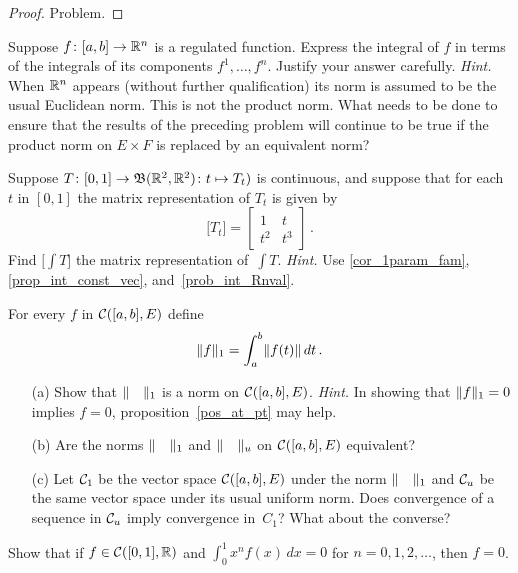 \begin{proof} Problem.  \ns  \end{proof}


\begin{prob}\label{prob_int_Rnval}  Suppose $f \colon [a,b] \rightarrow \mathbb{R}^n$ is a regulated function.
Express the integral of $f$ in terms of the integrals of its components $f^1, \dots, f^n$.
Justify your answer carefully.  \emph{Hint.}  When $\mathbb{R}^n$ appears (without further
qualification) its norm is assumed to be the usual Euclidean norm.  This is not the product
norm.  What needs to be done to ensure that the results of the preceding problem will continue
to be true if the product norm on $E \times F$ is replaced by an equivalent norm?
\end{prob}

\begin{prob} Suppose $T \colon [0,1] \rightarrow \mathfrak{B}(\mathbb{R}^2,\mathbb{R}^2)\colon  t \mapsto T_t)$ is continuous,
and suppose that for each $t$ in $[0,1]$ the matrix representation of $T_t$  is given by
  \[ \bigl[T_t\bigr] = \begin{bmatrix} 1 & t \\ t^2 & t^3 \end{bmatrix}\,. \]
Find $\bigl[\int T\bigr]$ the matrix representation of~$\int T$. \emph{Hint.} Use
\ref{cor_1param_fam}, \ref{prop_int_const_vec}, and~\ref{prob_int_Rnval}.
\end{prob}

\begin{prob}  For every $f$ in $\mathcal{C}([a,b],E)$ define
  \[ \lVert f\rVert_1 = \int_a^b \lVert f(t)\rVert\,dt\,. \]
 \begin{enumerate}
  \item[(a)] Show that $\lVert\quad\rVert_1$ is a norm on $\mathcal{C}([a,b],E)$. \emph{Hint.}  In showing
that $\lVert f\rVert_1 = 0$ implies $f = 0$, proposition~\ref{pos_at_pt} may help.
  \item[(b)] Are the norms $\lVert\quad\rVert_1$ and $\lVert\quad\rVert_u$ on $\mathcal{C}([a,b],E)$ equivalent?
  \item[(c)]  Let $\mathcal{C}_1$ be the vector space $\mathcal{C}([a,b],E)$ under the norm $\lVert\quad\rVert_1$
and $\mathcal{C}_u$ be the same vector space under its usual uniform norm.  Does convergence of a
sequence in $\mathcal{C}_u$ imply convergence in~$C_1$?  What about the converse?
 \end{enumerate}
\end{prob}

\begin{prob}  Show that if $f \in \mathcal{C}([0,1],\mathbb{R})$ and $\int_0^1 x^nf(x)\,dx = 0$ for
$n = 0,1,2,\dots$, then $f = 0$.
\end{prob}

